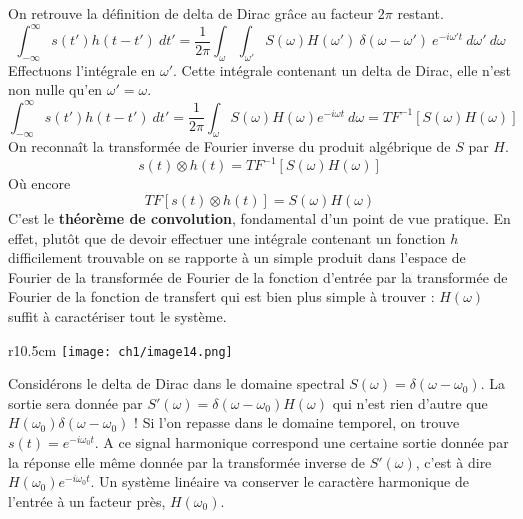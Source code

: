 On retrouve la définition de delta de Dirac grâce au facteur $2\pi$ restant.
\begin{equation}
\int_{-\infty}^\infty s(t')h(t-t')\ dt' = \frac{1}{2\pi}\int_\omega\int_{\omega'}
S(\omega)H(\omega')\ \delta(\omega-\omega')\ e^{-i\omega' t}\ d\omega'\ d\omega
\end{equation}
Effectuons l'intégrale en $\omega'$. Cette intégrale contenant un delta de Dirac, elle 
n'est non nulle qu'en $\omega'=\omega$. 
\begin{equation}
\int_{-\infty}^\infty s(t')h(t-t')\ dt' = \frac{1}{2\pi}\int_\omega
S(\omega)H(\omega)e^{-i\omega t}\ d\omega = TF^{-1}[S(\omega)H(\omega)]
\end{equation}
On reconnaît la transformée de Fourier inverse du produit algébrique de $S$ par $H$.
\begin{equation}
s(t) \otimes h(t) = TF^{-1}[S(\omega)H(\omega)]
\end{equation}
Où encore
\begin{equation}
TF[s(t) \otimes h(t)] = S(\omega)H(\omega)
\end{equation}
C'est le \textbf{théorème de convolution}, fondamental d'un point de vue pratique. En 
effet, plutôt que de devoir effectuer une intégrale contenant un fonction $h$ difficilement 
trouvable on se rapporte à un simple produit dans l'espace de Fourier de la transformée de 
Fourier de la fonction d'entrée par la transformée de Fourier de la fonction de transfert 
qui est bien plus simple à trouver : $H(\omega)$ suffit à caractériser tout le système.\\

\begin{wrapfigure}[11]{r}{10.5cm}
\vspace{-6mm}
\texttt{[image: ch1/image14.png]}
\end{wrapfigure}
Considérons le delta de Dirac dans le domaine spectral $S(\omega) = \delta(\omega-\omega_0)$. 
La sortie sera donnée par $S'(\omega) = \delta(\omega-\omega_0)H(\omega)$ qui n'est rien 
d'autre que $H(\omega_0)\delta(\omega-\omega_0)$ ! Si l'on repasse dans le domaine temporel, 
on trouve $s(t) = e^{-i\omega_0t}$. A ce signal harmonique correspond une certaine sortie 
donnée par la réponse elle même donnée par la transformée inverse de $S'(\omega)$, c'est à dire 
$H(\omega_0)e^{-i\omega_0t}$. Un système linéaire va conserver le caractère harmonique de 
l'entrée à un facteur près, $H(\omega_0)$.\\

